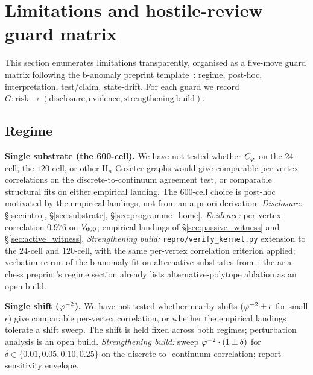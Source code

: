\section{Limitations and hostile-review guard matrix}\label{sec:limitations}

This section enumerates limitations transparently, organised as a
five-move guard matrix following the b-anomaly preprint
template~\citep{SmartBAnomaly2026}: regime, post-hoc, interpretation,
test/claim, state-drift. For each guard we record
$G\colon \mathrm{risk} \to (\mathrm{disclosure}, \mathrm{evidence},
\mathrm{strengthening\ build})$.

\subsection{Regime}\label{ssec:regime}

\textbf{Single substrate (the 600-cell).} We have not tested
whether $C_{\varphi}$ on the $24$-cell, the $120$-cell, or other H$_n$
Coxeter graphs would give comparable per-vertex correlations on
the discrete-to-continuum agreement test, or comparable structural
fits on either empirical landing. The 600-cell choice is post-hoc
motivated by the empirical landings, not from an a-priori
derivation. \emph{Disclosure:} \S\ref{sec:intro},
\S\ref{sec:substrate}, \S\ref{sec:programme_home}.
\emph{Evidence:} per-vertex correlation $0.976$ on $V_{600}$;
empirical landings of \S\ref{sec:passive_witness} and
\S\ref{sec:active_witness}. \emph{Strengthening build:}
\texttt{repro/verify\_kernel.py} extension to the $24$-cell and
$120$-cell, with the same per-vertex correlation criterion
applied; verbatim re-run of the b-anomaly fit on alternative
substrates from~\citep{SmartBAnomaly2026}; the aria-chess
preprint's regime section already lists alternative-polytope
ablation as an open build.

\textbf{Single shift ($\varphi^{-2}$).} We have not tested whether
nearby shifts ($\varphi^{-2} \pm \epsilon$ for small $\epsilon$) give
comparable per-vertex correlation, or whether the empirical
landings tolerate a shift sweep. The shift is held fixed across
both regimes; perturbation analysis is an open build.
\emph{Strengthening build:} sweep $\varphi^{-2} \cdot (1 \pm \delta)$
for $\delta \in \{0.01, 0.05, 0.10, 0.25\}$ on the discrete-to-
continuum correlation; report sensitivity envelope.

